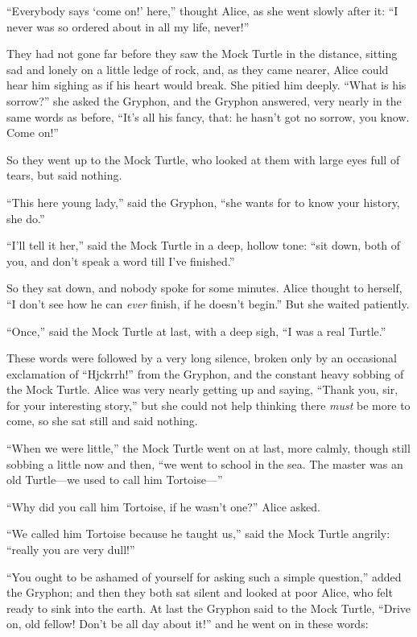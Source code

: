 \documentclass[book, 20pt]{extbook}
\begin{document}
``Everybody says `come on!' here,'' thought Alice, as she went slowly
after it: ``I never was so ordered about in all my life, never!''

They had not gone far before they saw the Mock Turtle in the distance,
sitting sad and lonely on a little ledge of rock, and, as they came
nearer, Alice could hear him sighing as if his heart would break. She
pitied him deeply. ``What is his sorrow?'' she asked the Gryphon, and
the Gryphon answered, very nearly in the same words as before, ``It's
all his fancy, that: he hasn't got no sorrow, you know. Come on!''

So they went up to the Mock Turtle, who looked at them with large eyes
full of tears, but said nothing.

``This here young lady,'' said the Gryphon, ``she wants for to know your
history, she do.''

``I'll tell it her,'' said the Mock Turtle in a deep, hollow tone: ``sit
down, both of you, and don't speak a word till I've finished.''

So they sat down, and nobody spoke for some minutes. Alice thought to
herself, ``I don't see how he can \emph{ever} finish, if he doesn't
begin.'' But she waited patiently.

``Once,'' said the Mock Turtle at last, with a deep sigh, ``I was a real
Turtle.''

These words were followed by a very long silence, broken only by an
occasional exclamation of ``Hjckrrh!'' from the Gryphon, and the
constant heavy sobbing of the Mock Turtle. Alice was very nearly getting
up and saying, ``Thank you, sir, for your interesting story,'' but she
could not help thinking there \emph{must} be more to come, so she sat
still and said nothing.

``When we were little,'' the Mock Turtle went on at last, more calmly,
though still sobbing a little now and then, ``we went to school in the
sea. The master was an old Turtle---we used to call him Tortoise---''

``Why did you call him Tortoise, if he wasn't one?'' Alice asked.

``We called him Tortoise because he taught us,'' said the Mock Turtle
angrily: ``really you are very dull!''

``You ought to be ashamed of yourself for asking such a simple
question,'' added the Gryphon; and then they both sat silent and looked
at poor Alice, who felt ready to sink into the earth. At last the
Gryphon said to the Mock Turtle, ``Drive on, old fellow! Don't be all
day about it!'' and he went on in these words:
\end{document}
